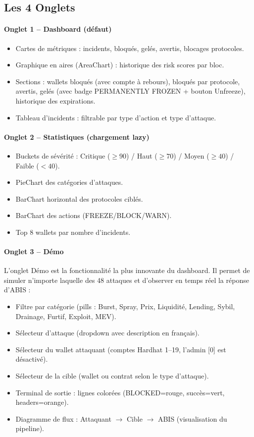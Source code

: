 \documentclass[12pt,a4paper]{report}
\begin{document}
\subsection{Les 4 Onglets}

\paragraph{Onglet 1 -- Dashboard (défaut)}
\begin{itemize}
  \item Cartes de métriques : incidents, bloqués, gelés, avertis, blocages protocoles.
  \item Graphique en aires (AreaChart) : historique des risk scores par bloc.
  \item Sections : wallets bloqués (avec compte à rebours), bloqués par protocole, avertis, gelés (avec badge PERMANENTLY FROZEN + bouton Unfreeze), historique des expirations.
  \item Tableau d'incidents : filtrable par type d'action et type d'attaque.
\end{itemize}

\paragraph{Onglet 2 -- Statistiques (chargement lazy)}
\begin{itemize}
  \item Buckets de sévérité : Critique ($\geq 90$) / Haut ($\geq 70$) / Moyen ($\geq 40$) / Faible ($< 40$).
  \item PieChart des catégories d'attaques.
  \item BarChart horizontal des protocoles ciblés.
  \item BarChart des actions (FREEZE/BLOCK/WARN).
  \item Top 8 wallets par nombre d'incidents.
\end{itemize}

\paragraph{Onglet 3 -- Démo}
L'onglet Démo est la fonctionnalité la plus innovante du dashboard. Il permet de simuler n'importe laquelle des 48 attaques et d'observer en temps réel la réponse d'ABIS :

\begin{itemize}
  \item Filtre par catégorie (pills : Burst, Spray, Prix, Liquidité, Lending, Sybil, Drainage, Furtif, Exploit, MEV).
  \item Sélecteur d'attaque (dropdown avec description en français).
  \item Sélecteur du wallet attaquant (comptes Hardhat 1--19, l'admin [0] est désactivé).
  \item Sélecteur de la cible (wallet ou contrat selon le type d'attaque).
  \item Terminal de sortie : lignes colorées (BLOCKED=rouge, succès=vert, headers=orange).
  \item Diagramme de flux : Attaquant $\to$ Cible $\to$ ABIS (visualisation du pipeline).
\end{itemize}
\end{document}
